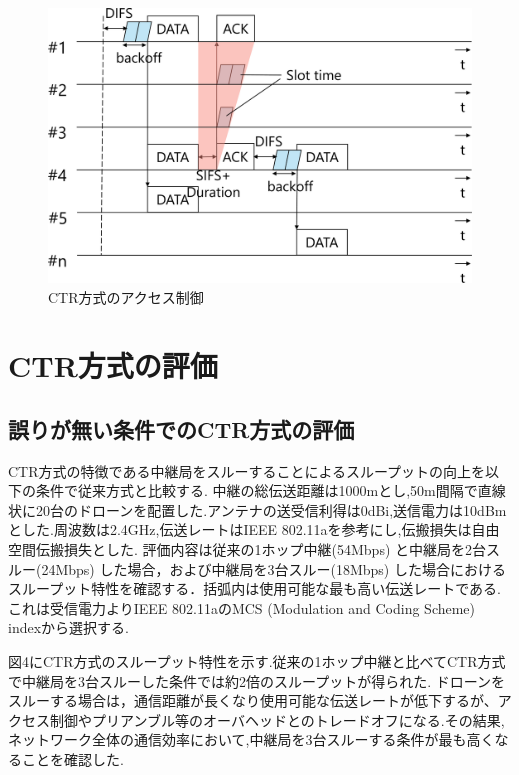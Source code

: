 \documentclass[a4paper,10.5pt]{ltjsarticle}
\begin{document}
\begin{figure}[H]
  \centering
  \includegraphics[width=\linewidth]{CTR_accsess.pdf} %
  \caption{CTR方式のアクセス制御}
  \label{fig:CTR方式のアクセス制御} %
\end{figure}

\clearpage
\section{CTR方式の評価}
\subsection{誤りが無い条件でのCTR方式の評価}
CTR方式の特徴である中継局をスルーすることによるスループットの向上を以下の条件で従来方式と比較する.
中継の総伝送距離は1000mとし,50m間隔で直線状に20台のドローンを配置した.アンテナの送受信利得は0dBi,送信電力は10dBmとした.周波数は2.4GHz,伝送レートはIEEE 802.11aを参考にし,伝搬損失は自由空間伝搬損失とした.
評価内容は従来の1ホップ中継(54Mbps) と中継局を2台スルー(24Mbps) した場合，および中継局を3台スルー(18Mbps) した場合におけるスループット特性を確認する．括弧内は使用可能な最も高い伝送レートである.これは受信電力よりIEEE 802.11aのMCS (Modulation and Coding Scheme) indexから選択する.

図4にCTR方式のスループット特性を示す.従来の1ホップ中継と比べてCTR方式で中継局を3台スルーした条件では約2倍のスループットが得られた.
ドローンをスルーする場合は，通信距離が長くなり使用可能な伝送レートが低下するが、アクセス制御やプリアンブル等のオーバヘッドとのトレードオフになる.その結果,ネットワーク全体の通信効率において,中継局を3台スルーする条件が最も高くなることを確認した.
\end{document}
